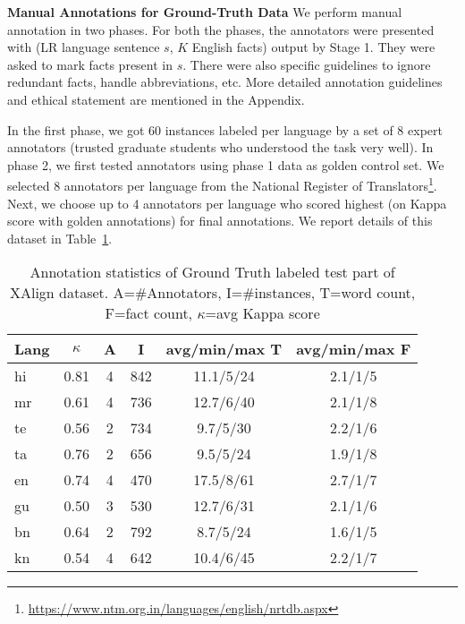 \documentclass[11pt]{article}
\begin{document}
\noindent\textbf{Manual Annotations for Ground-Truth Data}
We perform manual annotation in two phases. For both the phases, the annotators were presented with (LR language sentence $s$, $K$ English facts) output by Stage 1. They were asked to mark facts present in $s$. There were also specific guidelines to ignore redundant facts, handle abbreviations, etc. More detailed annotation guidelines and ethical statement are mentioned in the Appendix.

In the first phase, we got 60 instances labeled per language by a set of 8 expert annotators (trusted graduate students who understood the task very well). In phase 2, we first tested annotators using phase 1 data as golden control set. We selected 8 annotators per language from the National Register of Translators\footnote{\url{https://www.ntm.org.in/languages/english/nrtdb.aspx}}. Next, we choose up to 4 annotators per language who scored highest (on Kappa score with golden annotations) for final annotations. We report details of this dataset in Table~\ref{tab:annotationStats}. 

\begin{table}[!h]
    \centering
    \scriptsize
    \begin{tabular}{|l|c|c|c|c|c|}
    \hline
    Lang & $\kappa$&A&I&avg/min/max T&avg/min/max F\\
    \hline
    \hline
    hi&0.81&4&842&11.1/5/24&2.1/1/5\\
    \hline
    mr&0.61&4&736&12.7/6/40&2.1/1/8\\
    \hline
    te&0.56&2&734&9.7/5/30&2.2/1/6\\
    \hline
    ta&0.76&2&656&9.5/5/24&1.9/1/8\\
    \hline
    en&0.74&4&470&17.5/8/61&2.7/1/7\\
    \hline
    gu&0.50&3&530&12.7/6/31&2.1/1/6\\
    \hline
    bn&0.64&2&792&8.7/5/24&1.6/1/5\\
    \hline
    kn&0.54&4&642&10.4/6/45&2.2/1/7\\
    \hline
    \end{tabular}
    \caption{Annotation statistics of Ground Truth labeled test part of XAlign dataset. A=\#Annotators, I=\#instances, T=word count, F=fact count, $\kappa$=avg Kappa score}
    \label{tab:annotationStats}
\end{table}
\end{document}
